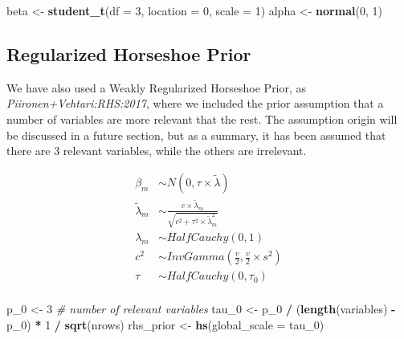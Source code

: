\documentclass[
]{article}
\newenvironment{Shaded}{\begin{snugshade}}{\end{snugshade}}
\newcommand{\CommentTok}[1]{\textcolor[rgb]{0.56,0.35,0.01}{\textit{#1}}}
\newcommand{\DataTypeTok}[1]{\textcolor[rgb]{0.13,0.29,0.53}{#1}}
\newcommand{\DecValTok}[1]{\textcolor[rgb]{0.00,0.00,0.81}{#1}}
\newcommand{\KeywordTok}[1]{\textcolor[rgb]{0.13,0.29,0.53}{\textbf{#1}}}
\newcommand{\NormalTok}[1]{#1}
\newcommand{\OperatorTok}[1]{\textcolor[rgb]{0.81,0.36,0.00}{\textbf{#1}}}
\newcommand{\StringTok}[1]{\textcolor[rgb]{0.31,0.60,0.02}{#1}}
\begin{document}
\begin{Shaded}
\begin{Highlighting}[]
\NormalTok{beta <-}\StringTok{ }\KeywordTok{student_t}\NormalTok{(}\DataTypeTok{df =} \DecValTok{3}\NormalTok{, }\DataTypeTok{location =} \DecValTok{0}\NormalTok{, }\DataTypeTok{scale =} \DecValTok{1}\NormalTok{)}
\NormalTok{alpha <-}\StringTok{ }\KeywordTok{normal}\NormalTok{(}\DecValTok{0}\NormalTok{, }\DecValTok{1}\NormalTok{)}
\end{Highlighting}
\end{Shaded}

\hypertarget{regularized-horseshoe-prior}{%
\subsection{Regularized Horseshoe
Prior}\label{regularized-horseshoe-prior}}

We have also used a Weakly Regularized Horseshoe Prior, as
\emph{Piironen+Vehtari:RHS:2017}, where we included the prior assumption
that a number of variables are more relevant that the rest. The
assumption origin will be discussed in a future section, but as a
summary, it has been assumed that there are 3 relevant variables, while
the others are irrelevant.

\[
\begin{aligned}
\beta_m &\sim N(0,\tau \times \tilde{\lambda}) \\[2pt]
\tilde\lambda_m &\sim \frac{c \times \tilde\lambda_m}{\sqrt{c^2 + \tau^2\times \tilde\lambda_m^2}} \\[2pt]
\lambda_m &\sim HalfCauchy(0,1) \\[2pt]
c^2 &\sim InvGamma(\frac{v}{2},\frac{v}{2}\times s^2)\\[2pt]
\tau &\sim HalfCauchy(0,\tau_0) \\[2pt]
\end{aligned}
\]

\begin{Shaded}
\begin{Highlighting}[]
\NormalTok{p_}\DecValTok{0}\NormalTok{ <-}\StringTok{ }\DecValTok{3} \CommentTok{# number of relevant variables}
\NormalTok{tau_}\DecValTok{0}\NormalTok{ <-}\StringTok{ }\NormalTok{p_}\DecValTok{0} \OperatorTok{/}\StringTok{ }\NormalTok{(}\KeywordTok{length}\NormalTok{(variables) }\OperatorTok{-}\StringTok{ }\NormalTok{p_}\DecValTok{0}\NormalTok{) }\OperatorTok{*}\StringTok{ }\DecValTok{1} \OperatorTok{/}\StringTok{ }\KeywordTok{sqrt}\NormalTok{(nrows)}
\NormalTok{rhs_prior <-}\StringTok{ }\KeywordTok{hs}\NormalTok{(}\DataTypeTok{global_scale =}\NormalTok{ tau_}\DecValTok{0}\NormalTok{)}
\end{Highlighting}
\end{Shaded}
\end{document}
